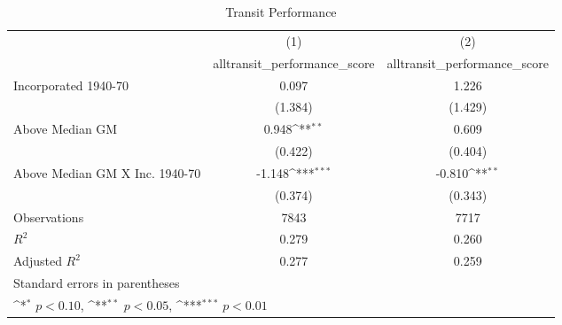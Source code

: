 \begin{table}[htbp]\centering
\def\sym#1{\ifmmode^{#1}\else\(^{#1}\)\fi}
\caption{Transit Performance}
\begin{tabular}{l*{2}{c}}
\hline\hline
                    &\multicolumn{1}{c}{(1)}&\multicolumn{1}{c}{(2)}\\
                    &\multicolumn{1}{c}{alltransit\_performance\_score}&\multicolumn{1}{c}{alltransit\_performance\_score}\\
\hline
Incorporated 1940-70&       0.097         &       1.226         \\
                    &     (1.384)         &     (1.429)         \\
[1em]
Above Median GM     &       0.948\sym{**} &       0.609         \\
                    &     (0.422)         &     (0.404)         \\
[1em]
Above Median GM X Inc. 1940-70&      -1.148\sym{***}&      -0.810\sym{**} \\
                    &     (0.374)         &     (0.343)         \\
\hline
Observations        &        7843         &        7717         \\
\(R^{2}\)           &       0.279         &       0.260         \\
Adjusted \(R^{2}\)  &       0.277         &       0.259         \\
\hline\hline
\multicolumn{3}{l}{\footnotesize Standard errors in parentheses}\\
\multicolumn{3}{l}{\footnotesize \sym{*} \(p<0.10\), \sym{**} \(p<0.05\), \sym{***} \(p<0.01\)}\\
\end{tabular}
\end{table}
